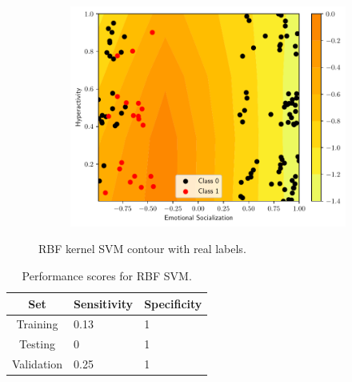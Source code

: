 \begin{figure}
\begin{subfigure}[b]{0.32\textwidth}
        \includegraphics[width=\textwidth]{figs/svm-rbf-contour-2-5.pdf}
        \caption{}
    \end{subfigure}
    \caption{RBF kernel SVM contour with real labels.}
    \label{fig:SVM-rbf}
\end{figure}

\begin{table}
\centering
\caption{Performance scores for RBF SVM.}
\label{tab:rbf_SVM}
\begin{tabular}{cll}
\hline
\textbf{Set} & \multicolumn{1}{c}{\textbf{Sensitivity}} & \multicolumn{1}{c}{\textbf{Specificity}} \\ \hline
Training & 0.13 & 1 \\
Testing & 0 & 1 \\
Validation & 0.25 & 1 \\ \hline
\end{tabular}
\end{table}
